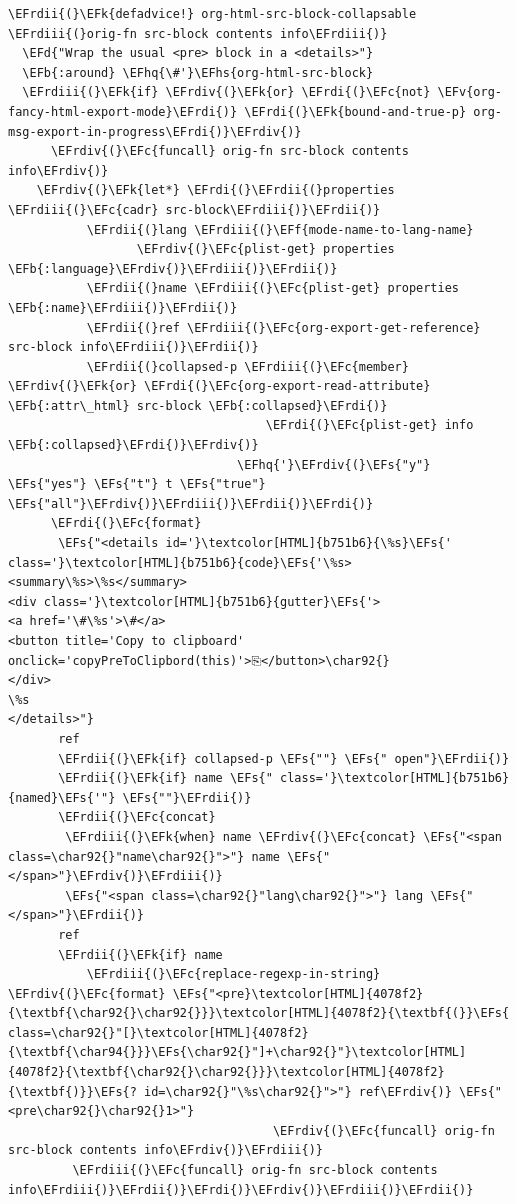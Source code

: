 \documentclass{scrartcl}
\newcommand{\EFk}[1]{\textcolor{EFk}{#1}} %
\newcommand{\EFd}[1]{\textcolor{EFd}{\textit{#1}}} %
\newcommand{\EFs}[1]{\textcolor{EFs}{#1}} %
\newcommand{\EFb}[1]{\textcolor{EFb}{#1}} %
\newcommand{\EFc}[1]{\textcolor{EFc}{#1}} %
\newcommand{\EFv}[1]{\textcolor{EFv}{#1}} %
\newcommand{\EFf}[1]{\textcolor{EFf}{#1}} %
\newcommand{\EFhq}[1]{\textcolor{EFhq}{#1}} %
\newcommand{\EFhs}[1]{\textcolor{EFhs}{#1}} %
\newcommand{\EFrdi}[1]{\textcolor{EFrdi}{#1}} %
\newcommand{\EFrdii}[1]{\textcolor{EFrdii}{#1}} %
\newcommand{\EFrdiii}[1]{\textcolor{EFrdiii}{#1}} %
\newcommand{\EFrdiv}[1]{\textcolor{EFrdiv}{#1}} %
\begin{document}
\begin{Code}
\begin{Verbatim}[]
\EFrdii{(}\EFk{defadvice!} org-html-src-block-collapsable \EFrdiii{(}orig-fn src-block contents info\EFrdiii{)}
  \EFd{"Wrap the usual <pre> block in a <details>"}
  \EFb{:around} \EFhq{\#'}\EFhs{org-html-src-block}
  \EFrdiii{(}\EFk{if} \EFrdiv{(}\EFk{or} \EFrdi{(}\EFc{not} \EFv{org-fancy-html-export-mode}\EFrdi{)} \EFrdi{(}\EFk{bound-and-true-p} org-msg-export-in-progress\EFrdi{)}\EFrdiv{)}
      \EFrdiv{(}\EFc{funcall} orig-fn src-block contents info\EFrdiv{)}
    \EFrdiv{(}\EFk{let*} \EFrdi{(}\EFrdii{(}properties \EFrdiii{(}\EFc{cadr} src-block\EFrdiii{)}\EFrdii{)}
           \EFrdii{(}lang \EFrdiii{(}\EFf{mode-name-to-lang-name}
                  \EFrdiv{(}\EFc{plist-get} properties \EFb{:language}\EFrdiv{)}\EFrdiii{)}\EFrdii{)}
           \EFrdii{(}name \EFrdiii{(}\EFc{plist-get} properties \EFb{:name}\EFrdiii{)}\EFrdii{)}
           \EFrdii{(}ref \EFrdiii{(}\EFc{org-export-get-reference} src-block info\EFrdiii{)}\EFrdii{)}
           \EFrdii{(}collapsed-p \EFrdiii{(}\EFc{member} \EFrdiv{(}\EFk{or} \EFrdi{(}\EFc{org-export-read-attribute} \EFb{:attr\_html} src-block \EFb{:collapsed}\EFrdi{)}
                                    \EFrdi{(}\EFc{plist-get} info \EFb{:collapsed}\EFrdi{)}\EFrdiv{)}
                                \EFhq{'}\EFrdiv{(}\EFs{"y"} \EFs{"yes"} \EFs{"t"} t \EFs{"true"} \EFs{"all"}\EFrdiv{)}\EFrdiii{)}\EFrdii{)}\EFrdi{)}
      \EFrdi{(}\EFc{format}
       \EFs{"<details id='}\textcolor[HTML]{b751b6}{\%s}\EFs{' class='}\textcolor[HTML]{b751b6}{code}\EFs{'\%s><summary\%s>\%s</summary>
<div class='}\textcolor[HTML]{b751b6}{gutter}\EFs{'>
<a href='\#\%s'>\#</a>
<button title='Copy to clipboard' onclick='copyPreToClipbord(this)'>⎘</button>\char92{}
</div>
\%s
</details>"}
       ref
       \EFrdii{(}\EFk{if} collapsed-p \EFs{""} \EFs{" open"}\EFrdii{)}
       \EFrdii{(}\EFk{if} name \EFs{" class='}\textcolor[HTML]{b751b6}{named}\EFs{'"} \EFs{""}\EFrdii{)}
       \EFrdii{(}\EFc{concat}
        \EFrdiii{(}\EFk{when} name \EFrdiv{(}\EFc{concat} \EFs{"<span class=\char92{}"name\char92{}">"} name \EFs{"</span>"}\EFrdiv{)}\EFrdiii{)}
        \EFs{"<span class=\char92{}"lang\char92{}">"} lang \EFs{"</span>"}\EFrdii{)}
       ref
       \EFrdii{(}\EFk{if} name
           \EFrdiii{(}\EFc{replace-regexp-in-string} \EFrdiv{(}\EFc{format} \EFs{"<pre}\textcolor[HTML]{4078f2}{\textbf{\char92{}\char92{}}}\textcolor[HTML]{4078f2}{\textbf{(}}\EFs{ class=\char92{}"[}\textcolor[HTML]{4078f2}{\textbf{\char94{}}}\EFs{\char92{}"]+\char92{}"}\textcolor[HTML]{4078f2}{\textbf{\char92{}\char92{}}}\textcolor[HTML]{4078f2}{\textbf{)}}\EFs{? id=\char92{}"\%s\char92{}">"} ref\EFrdiv{)} \EFs{"<pre\char92{}\char92{}1>"}
                                     \EFrdiv{(}\EFc{funcall} orig-fn src-block contents info\EFrdiv{)}\EFrdiii{)}
         \EFrdiii{(}\EFc{funcall} orig-fn src-block contents info\EFrdiii{)}\EFrdii{)}\EFrdi{)}\EFrdiv{)}\EFrdiii{)}\EFrdii{)}


\end{Verbatim}
\end{Code}
\end{document}
